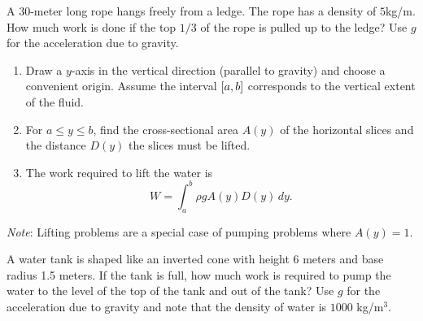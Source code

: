\documentclass[../mathNotesPreamble]{subfiles}
\begin{document}
  \begin{ex*}
    A $30$-meter long rope hangs freely from a ledge. The rope has a density of $5$\nobreakspace kg/m.  How much work is done if the top $1/3$ of the rope is pulled up to the ledge? Use $g$ for the acceleration due to gravity.
  \end{ex*}
  \pagebreak

  \begin{thmBox*}
    \begin{enumerate}
      \item 
        Draw a $y$-axis in the vertical direction (parallel to gravity) and choose a convenient origin. Assume the interval ${\left[a,b\right]}$ corresponds to the vertical extent of the fluid.
      \item 
        For $a\leq y\leq b$, find the cross-sectional area $A(y)$ of the horizontal slices and the distance $D(y)$ the slices must be lifted.
      \item 
        The work required to lift the water is
          \[W=\int_a^b \rho gA(y)D(y)\,dy.\]
    \end{enumerate}
    \textit{Note}: Lifting problems are a special case of pumping problems where $A(y)=1$.
  \end{thmBox*}

  \begin{ex*}
    A water tank is shaped like an inverted cone with height 6 meters and base radius 1.5 meters. If the tank is full, how much work is required to pump the water to the level of the top of the tank and out of the tank? Use $g$ for the acceleration due to gravity and note that the density of water is $1000$ kg/m$^3$. 
  \end{ex*}
  \begin{flushright}
  \end{flushright}
  \pagebreak
\end{document}
